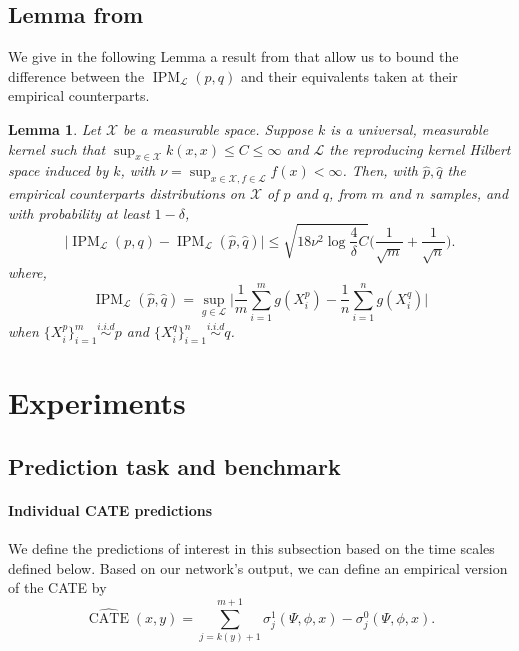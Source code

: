 \documentclass[12pt]{article}
\theoremstyle{plain}
\newtheorem{lemma}[theorem]{Lemma}
\theoremstyle{definition}
\theoremstyle{remark}
\DeclareMathOperator{\CATE}{\text{CATE}}
\begin{document}
\subsection{Lemma from \cite{Sriperumbudur2009OnIP}}
We give in the following Lemma a result from \cite{Sriperumbudur2009OnIP} that allow us to bound the difference between the $\operatorname{IPM}_{\mathcal{L}}(p, q)$ and their equivalents taken at their empirical counterparts.
\begin{lemma}{\cite{Sriperumbudur2009OnIP}}
Let $\mathcal{X}$ be a measurable space. Suppose $k$ is a universal, measurable kernel such that $\sup _{x \in \mathcal{X}} k(x, x) \leq C \leq \infty$ and $\mathcal{L}$ the reproducing kernel Hilbert space induced by $k$, with $\nu=\sup _{x \in \mathcal{X}, f \in \mathcal{L}} f(x)<\infty$. Then, with $\hat{p}, \hat{q}$ the empirical counterparts distributions on $\mathcal{X}$ of $p$ and $q$, from $m$ and $n$ samples, and with probability at least $1-\delta$,
\begin{equation}
    \Big|\operatorname{IPM}_{\mathcal{L}}(p, q)-\operatorname{IPM}_{\mathcal{L}}(\hat{p}, \hat{q})\Big| \leq \sqrt{18 \nu^{2} \log \frac{4}{\delta} C}\Big(\frac{1}{\sqrt{m}}+\frac{1}{\sqrt{n}}\Big) .
\end{equation}
where,
\begin{equation*}
    \operatorname{IPM}_{\mathcal{L}}(\hat{p}, \hat{q})= \sup_{g \in \mathcal{L}}\Big |\frac{1}{m} \sum_{i=1}^m g(X_i^p) - \frac{1}{n} \sum_{i=1}^n g(X_i^q)  \Big |
\end{equation*}
when $\{X_i^p\}_{i=1}^m \overset{i.i.d}{\sim } p$ and $\{X_i^q\}_{i=1}^n \overset{i.i.d}{\sim } q$.
\end{lemma}

\section{Experiments}
\label{app:experiments}
\subsection{Prediction task and benchmark}

\paragraph{Individual CATE predictions}
We define the predictions of interest in this subsection based on the time scales defined below. Based on our network's output, we can define an empirical version of the CATE by
\begin{equation*}
   \widehat{\CATE}(x,y) =\sum ^{m+1}_{j=k(y)+ 1} \sigma ^{1}_{j}( \Psi ,\phi ,x) - \sigma ^{0}_{j}( \Psi ,\phi ,x).
\end{equation*}
\end{document}
